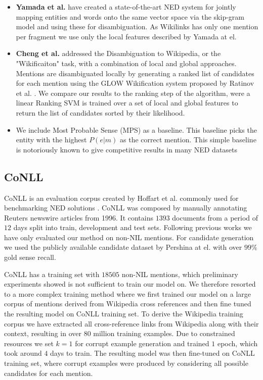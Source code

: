 \documentclass[11pt]{article}
\begin{document}
	\begin{itemize} 
		\item  \textbf{Yamada et al.}  have created a state-of-the-art NED system for jointly mapping entities and words onto the same vector space via the skip-gram model and using these for disambiguation. As Wikilinks has only one mention per fragment we use only the local features described by Yamada at el.
		
		\item \textbf{Cheng et al.}  addressed the Disambiguation to Wikipedia, or the "Wikificaiton" task, with a combination of local and global approaches. Mentions are disambiguated locally by generating a ranked list of candidates for each mention using the GLOW Wikification system proposed by Ratinov et al. . We compare our results to the ranking step of the algorithm, were a linear Ranking SVM is trained over a set of local and global features to return the list of candidates sorted by their likelihood.
		
		\item We include Most Probable Sense (MPS) as a baseline. This baseline picks the entity with the highest $P(e|m)$ as the correct mention. This simple baseline is notoriously known to give competitive results in many NED datasets 
	\end{itemize}

    \subsection{CoNLL}
    CoNLL is an evaluation corpus created by Hoffart et al.  commonly used for benchmarking NED solutions \cite{Globerson2016,Hachey2013,Yamada2016,Pershina2015}. CoNLL was composed by manually annotating Reuters newswire articles from 1996. It contains $1393$ documents from a period of $12$ days split into train, development and test sets. Following previous works we have only evaluated our method on non-NIL mentions. For candidate generation we used the publicly available candidate dataset by Pershina at el.  with over $99\%$ gold sense recall.
	
	CoNLL has a training set with $18505$ non-NIL mentions, which preliminary experiments showed is not sufficient to train our model on. We therefore resorted to a more complex training method where we first trained our model on a large corpus of mentions derived from Wikipedia cross references and then fine tuned the resulting model on CoNLL training set. To derive the Wikipedia training corpus we have extracted all cross-reference links from Wikipedia along with their context, resulting in over $80$ million training examples. Due to constrained resources we set $k=1$ for corrupt example generation and trained $1$ epoch, which took around $4$ days to train. The resulting model was then fine-tuned on CoNLL training set, where corrupt examples were produced by considering all possible candidates for each mention.
\end{document}
